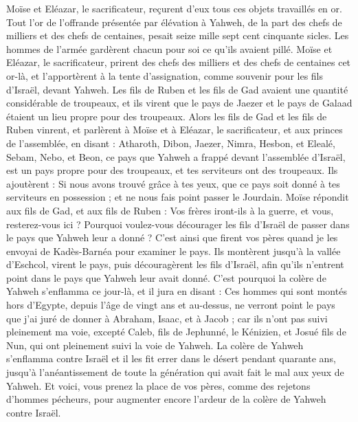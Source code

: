 \begin{multicols}{2}
Moïse et Eléazar, le sacrificateur, reçurent d'eux tous ces objets travaillés en or.
Tout l'or de l'offrande présentée par élévation à Yahweh, de la part des chefs de milliers et des chefs de centaines, pesait seize mille sept cent cinquante sicles.
Les hommes de l’armée gardèrent chacun pour soi ce qu'ils avaient pillé.
Moïse et Eléazar, le sacrificateur, prirent des chefs des milliers et des chefs de centaines cet or-là, et l'apportèrent à la tente d'assignation, comme souvenir pour les fils d'Israël, devant Yahweh.
\VerseOne{}Les fils de Ruben et les fils de Gad avaient une quantité considérable de troupeaux, et ils virent que le pays de Jaezer et le pays de Galaad étaient un lieu propre pour des troupeaux.
Alors les fils de Gad et les fils de Ruben vinrent, et parlèrent à Moïse et à Eléazar, le sacrificateur, et aux princes de l'assemblée, en disant :
Atharoth, Dibon, Jaezer, Nimra, Hesbon, et Elealé, Sebam, Nebo, et Beon,
ce pays que Yahweh a frappé devant l'assemblée d'Israël, est un pays propre pour des troupeaux, et tes serviteurs ont des troupeaux.
Ils ajoutèrent : Si nous avons trouvé grâce à tes yeux, que ce pays soit donné à tes serviteurs en possession ; et ne nous fais point passer le Jourdain.
Moïse répondit aux fils de Gad, et aux fils de Ruben : Vos frères iront-ils à la guerre, et vous, resterez-vous ici ?
Pourquoi voulez-vous décourager les fils d'Israël de passer dans le pays que Yahweh leur a donné ?
C'est ainsi que firent vos pères quand je les envoyai de Kadès-Barnéa pour examiner le pays.
Ils montèrent jusqu'à la vallée d'Eschcol, virent le pays, puis découragèrent les fils d'Israël, afin qu'ils n'entrent point dans le pays que Yahweh leur avait donné.
C'est pourquoi la colère de Yahweh s'enflamma ce jour-là, et il jura en disant :
Ces hommes qui sont montés hors d'Egypte, depuis l'âge de vingt ans et au-dessus, ne verront point le pays que j'ai juré de donner à Abraham, Isaac, et à Jacob ; car ils n'ont pas suivi pleinement ma voie,
excepté Caleb, fils de Jephunné, le Kénizien, et Josué fils de Nun, qui ont pleinement suivi la voie de Yahweh.
La colère de Yahweh s'enflamma contre Israël et il les fit errer dans le désert pendant quarante ans, jusqu’à l’anéantissement de toute la génération qui avait fait le mal aux yeux de Yahweh.
Et voici, vous prenez la place de vos pères, comme des rejetons d'hommes pécheurs, pour augmenter encore l'ardeur de la colère de Yahweh contre Israël.

\end{multicols}
